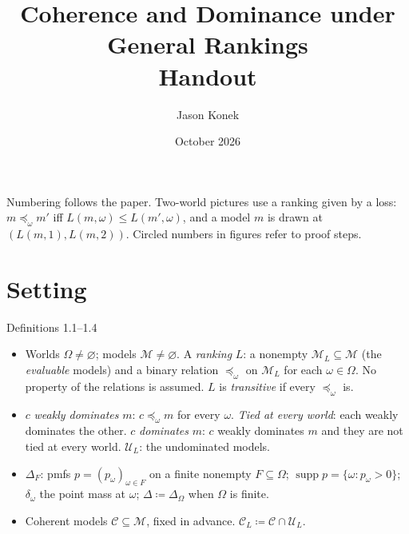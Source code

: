 \documentclass[11pt]{article}
\title{Coherence and Dominance under General Rankings\\[2pt]\large Handout}
\author{Jason Konek}
\date{October 2026}
\newcommand{\M}{\mathcal M}
\newcommand{\C}{\mathcal C}
\newcommand{\U}{\mathcal U}
\newcommand{\supp}{\operatorname{supp}}
\begin{document}
\maketitle

Numbering follows the paper. Two-world pictures use a ranking given by a loss: $m\preceq_\omega m'$ iff $L(m,\omega)\le L(m',\omega)$, and a model $m$ is drawn at $(L(m,1),L(m,2))$. Circled numbers in figures refer to proof steps.

\section{Setting}

\begin{stmt}{Definitions 1.1--1.4}
\begin{itemize}[leftmargin=*]
\item Worlds $\Omega\ne\varnothing$; models $\M\ne\varnothing$. A \emph{ranking} $L$: a nonempty $\M_L\subseteq\M$ (the \emph{evaluable} models) and a binary relation $\preceq_\omega$ on $\M_L$ for each $\omega\in\Omega$. No property of the relations is assumed. $L$ is \emph{transitive} if every $\preceq_\omega$ is.
\item $c$ \emph{weakly dominates} $m$: $c\preceq_\omega m$ for every $\omega$. \emph{Tied at every world}: each weakly dominates the other. $c$ \emph{dominates} $m$: $c$ weakly dominates $m$ and they are not tied at every world. $\U_L$: the undominated models.
\item $\Delta_F$: pmfs $p=(p_\omega)_{\omega\in F}$ on a finite nonempty $F\subseteq\Omega$; $\supp p=\{\omega:p_\omega>0\}$; $\delta_\omega$ the point mass at $\omega$; $\Delta\coloneqq\Delta_\Omega$ when $\Omega$ is finite.
\item Coherent models $\C\subseteq\M$, fixed in advance. $\C_L\coloneqq\C\cap\U_L$.
\end{itemize}
\end{stmt}
\end{document}
